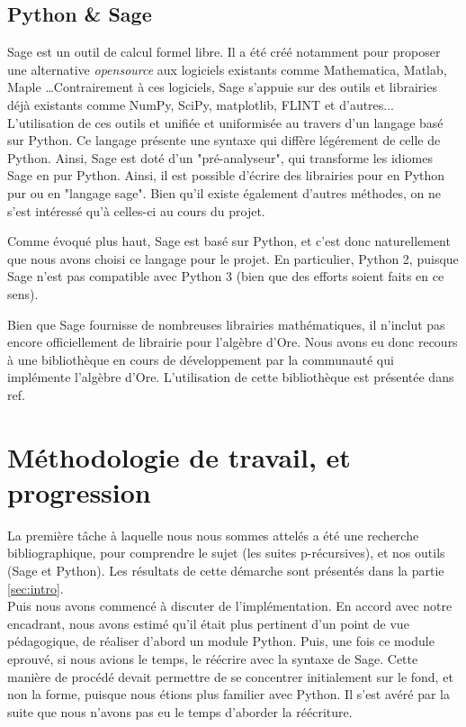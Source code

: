 \documentclass[12pt]{article}
\begin{document}
    \subsection{Python \& Sage}
        \label{ssec:sage}
        \par Sage est un outil de calcul formel libre.
        Il a été créé notamment pour proposer
        une alternative \textit{opensource} aux logiciels existants comme Mathematica,
        Matlab, Maple \ldots Contrairement à ces logiciels, Sage s'appuie sur des outils
        et librairies déjà existants comme NumPy, SciPy, matplotlib, FLINT et d'autres...
        L'utilisation de ces outils et unifiée et uniformisée au travers d'un langage
        basé sur Python. Ce langage présente une syntaxe qui diffère légérement de celle
        de Python. Ainsi, Sage est doté d'un "pré-analyseur",
        qui transforme les idiomes Sage en pur Python.
        Ainsi, il est possible d'écrire des librairies pour en Python pur ou en "langage sage".
        Bien qu'il existe également d'autres méthodes, on ne s'est intéressé qu'à celles-ci au
        cours du projet.
        \par Comme évoqué plus haut, Sage est basé sur Python, et c'est donc naturellement
        que nous avons choisi ce langage pour le projet.
        En particulier, Python 2, puisque Sage n'est pas compatible avec Python 3
        (bien que des efforts soient faits en ce sens).
        \par Bien que Sage fournisse de nombreuses librairies mathématiques,
        il n'inclut pas encore officiellement de librairie pour l'algèbre d'Ore.
        Nous avons eu donc recours à une bibliothèque en cours de développement par
        la communauté qui implémente l'algèbre d'Ore. L'utilisation de cette bibliothèque
        est présentée dans {\color{red} ref}.
\section{Méthodologie de travail, et progression}
    \label{sec:methodo}
    \par La première tâche à laquelle nous nous sommes attelés a été une recherche bibliographique,
    pour comprendre le sujet (les suites p-récursives), et nos outils (Sage et Python).
    Les résultats de cette démarche sont présentés dans la partie \ref{sec:intro}.\\
    Puis nous avons commencé à discuter de l'implémentation. En accord avec notre encadrant,
    nous avons estimé qu'il était plus pertinent d'un point de vue pédagogique, de réaliser
    d'abord un module Python. Puis, une fois ce module eprouvé, si nous avions le temps,
    le réécrire avec la syntaxe de Sage. Cette manière de procédé devait permettre de se
    concentrer initialement sur le fond, et non la forme, puisque nous étions plus familier
    avec Python. {\color{blue} Il s'est avéré par la suite que nous n'avons pas eu le temps
    d'aborder la réécriture}.
\end{document}
